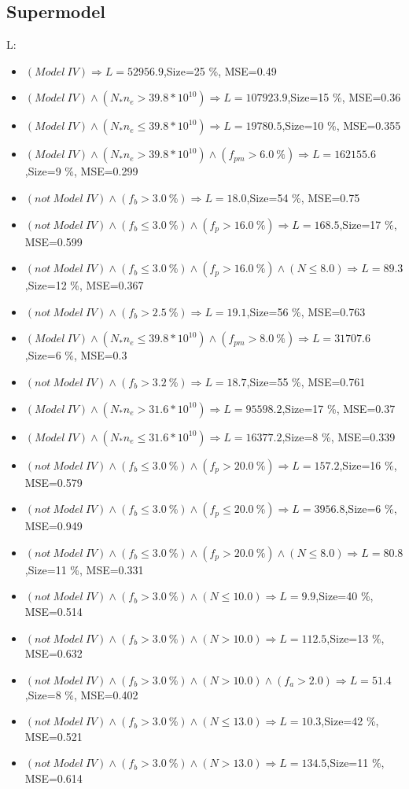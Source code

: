 \documentclass[numbered]{CSL}
\begin{document}
\subsection{Supermodel}
L:
\begin{itemize}
\item $(Model~IV) \Rightarrow L = 52956.9$,\hfill Size=25 \%, MSE=0.49
\item $(Model~IV) \land (N_* n_e > 39.8 * 10^{10}) \Rightarrow L = 107923.9$,\hfill Size=15 \%, MSE=0.36
\item $(Model~IV) \land (N_* n_e \leq 39.8 * 10^{10}) \Rightarrow L = 19780.5$,\hfill Size=10 \%, MSE=0.355
\item $(Model~IV) \land (N_* n_e > 39.8 * 10^{10}) \land (f_{pm} > 6.0~\%) \Rightarrow L = 162155.6$,\hfill Size=9 \%, MSE=0.299
\item $(not~Model~IV) \land (f_b > 3.0~\%) \Rightarrow L = 18.0$,\hfill Size=54 \%, MSE=0.75
\item $(not~Model~IV) \land (f_b \leq 3.0~\%) \land (f_p > 16.0~\%) \Rightarrow L = 168.5$,\hfill Size=17 \%, MSE=0.599
\item $(not~Model~IV) \land (f_b \leq 3.0~\%) \land (f_p > 16.0~\%) \land (N \leq 8.0) \Rightarrow L = 89.3$,\hfill Size=12 \%, MSE=0.367
\item $(not~Model~IV) \land (f_b > 2.5~\%) \Rightarrow L = 19.1$,\hfill Size=56 \%, MSE=0.763
\item $(Model~IV) \land (N_* n_e \leq 39.8 * 10^{10}) \land (f_{pm} > 8.0~\%) \Rightarrow L = 31707.6$,\hfill Size=6 \%, MSE=0.3
\item $(not~Model~IV) \land (f_b > 3.2~\%) \Rightarrow L = 18.7$,\hfill Size=55 \%, MSE=0.761
\item $(Model~IV) \land (N_* n_e > 31.6 * 10^{10}) \Rightarrow L = 95598.2$,\hfill Size=17 \%, MSE=0.37
\item $(Model~IV) \land (N_* n_e \leq 31.6 * 10^{10}) \Rightarrow L = 16377.2$,\hfill Size=8 \%, MSE=0.339
\item $(not~Model~IV) \land (f_b \leq 3.0~\%) \land (f_p > 20.0~\%) \Rightarrow L = 157.2$,\hfill Size=16 \%, MSE=0.579
\item $(not~Model~IV) \land (f_b \leq 3.0~\%) \land (f_p \leq 20.0~\%) \Rightarrow L = 3956.8$,\hfill Size=6 \%, MSE=0.949
\item $(not~Model~IV) \land (f_b \leq 3.0~\%) \land (f_p > 20.0~\%) \land (N \leq 8.0) \Rightarrow L = 80.8$,\hfill Size=11 \%, MSE=0.331
\item $(not~Model~IV) \land (f_b > 3.0~\%) \land (N \leq 10.0) \Rightarrow L = 9.9$,\hfill Size=40 \%, MSE=0.514
\item $(not~Model~IV) \land (f_b > 3.0~\%) \land (N > 10.0) \Rightarrow L = 112.5$,\hfill Size=13 \%, MSE=0.632
\item $(not~Model~IV) \land (f_b > 3.0~\%) \land (N > 10.0) \land (f_a > 2.0) \Rightarrow L = 51.4$,\hfill Size=8 \%, MSE=0.402
\item $(not~Model~IV) \land (f_b > 3.0~\%) \land (N \leq 13.0) \Rightarrow L = 10.3$,\hfill Size=42 \%, MSE=0.521
\item $(not~Model~IV) \land (f_b > 3.0~\%) \land (N > 13.0) \Rightarrow L = 134.5$,\hfill Size=11 \%, MSE=0.614
\end{itemize}
\end{document}
